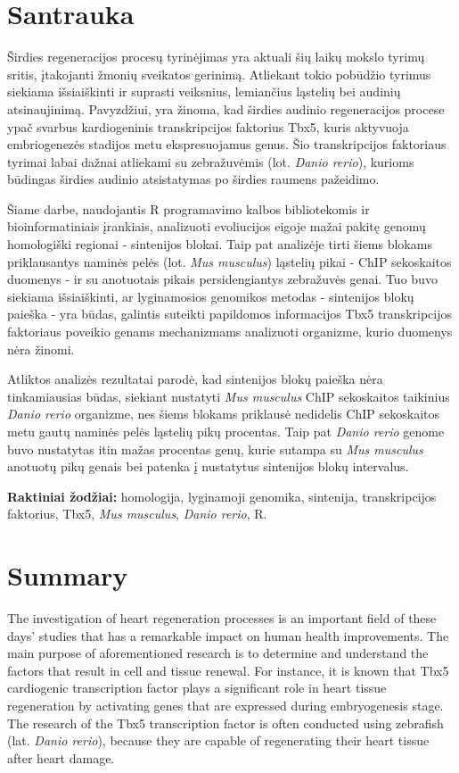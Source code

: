 \documentclass[12pt]{article}
\begin{document}
\section*{Santrauka}
Širdies regeneracijos procesų tyrinėjimas yra aktuali šių laikų mokslo tyrimų
sritis, įtakojanti žmonių sveikatos gerinimą. Atliekant tokio pobūdžio
tyrimus siekiama išsiaiškinti ir suprasti veiksnius, lemiančius ląstelių bei
audinių atsinaujinimą. Pavyzdžiui, yra žinoma, kad širdies audinio regeneracijos
procese ypač svarbus kardiogeninis transkripcijos faktorius Tbx5, kuris
aktyvuoja embriogenezės stadijos metu ekspresuojamus genus. Šio transkripcijos
faktoriaus tyrimai labai dažnai atliekami su zebražuvėmis (lot.
\emph{Danio rerio}), kurioms būdingas širdies audinio atsistatymas po širdies
raumens pažeidimo.

Šiame darbe, naudojantis R programavimo kalbos bibliotekomis ir
bioinformatiniais įrankiais, analizuoti evoliucijos eigoje mažai pakitę genomų
homologiški regionai - sintenijos blokai. Taip pat analizėje tirti šiems blokams
priklausantys naminės pelės (lot. \emph{Mus musculus}) ląstelių pikai - ChIP
sekoskaitos duomenys - ir su anotuotais pikais persidengiantys zebražuvės genai.
Tuo buvo siekiama išsiaiškinti, ar lyginamosios genomikos metodas - sintenijos
blokų paieška - yra būdas, galintis suteikti papildomos informacijos Tbx5
transkripcijos faktoriaus poveikio genams mechanizmams analizuoti organizme,
kurio duomenys nėra žinomi.

Atliktos analizės rezultatai parodė, kad sintenijos blokų paieška nėra
tinkamiausias būdas, siekiant nustatyti \emph{Mus musculus} ChIP sekoskaitos
taikinius \emph{Danio rerio} organizme, nes šiems blokams priklausė nedidelis
ChIP sekoskaitos metu gautų naminės pelės ląstelių pikų procentas. Taip pat
\emph{Danio rerio} genome buvo nustatytas itin mažas procentas genų, kurie
sutampa su \emph{Mus musculus} anotuotų pikų genais bei patenka į nustatytus
sintenijos blokų intervalus.

\hfill \break

\textbf{Raktiniai žodžiai:} homologija, lyginamoji genomika, sintenija,
transkripcijos faktorius, Tbx5, \emph{Mus musculus}, \emph{Danio rerio}, R.

\newpage


\section*{Summary}
The investigation of heart regeneration processes is an important field of
these days' studies that has a remarkable impact on human health improvements.
The main purpose of aforementioned research is to determine and understand the
factors that result in cell and tissue renewal. For instance, it is known that
Tbx5 cardiogenic transcription factor plays a significant role in heart tissue
regeneration by activating genes that are expressed during embryogenesis stage.
The research of the Tbx5 transcription factor is often conducted using 
zebrafish (lat. \emph{Danio rerio}), because they are capable of regenerating
their heart tissue after heart damage.
\end{document}
